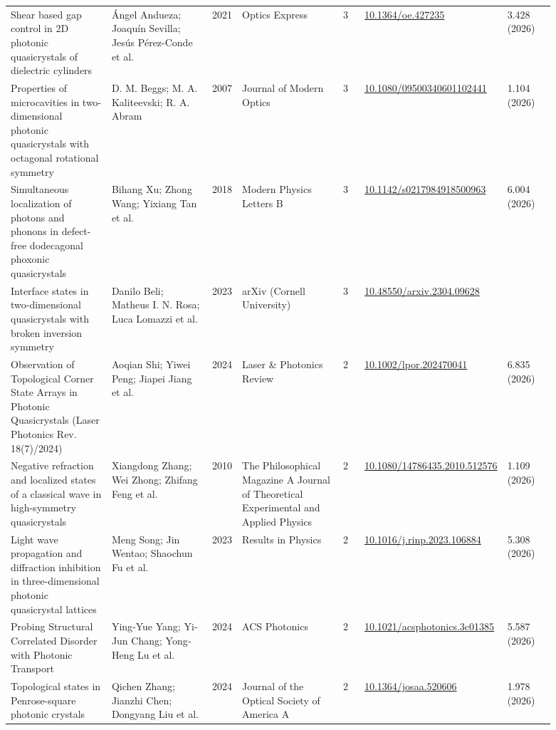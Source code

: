 \documentclass[10pt,a4paper]{article}
\begin{document}
{\begin{longtable}{p{0.192\linewidth}p{0.192\linewidth}p{0.043\linewidth}p{0.192\linewidth}p{0.043\linewidth}p{0.132\linewidth}p{0.096\linewidth}}
Shear based gap control in 2D photonic quasicrystals of dielectric cylinders & Ángel Andueza; Joaquín Sevilla; Jesús Pérez-Conde et al. & 2021 & Optics Express & 3 & \href{https://doi.org/10.1364/oe.427235}{10.1364/oe.427235} & 3.428 (2026) \\
Properties of microcavities in two-dimensional photonic quasicrystals with octagonal rotational symmetry & D. M. Beggs; M. A. Kaliteevski; R. A. Abram & 2007 & Journal of Modern Optics & 3 & \href{https://doi.org/10.1080/09500340601102441}{10.1080/09500340601102441} & 1.104 (2026) \\
Simultaneous localization of photons and phonons in defect-free dodecagonal phoxonic quasicrystals & Bihang Xu; Zhong Wang; Yixiang Tan et al. & 2018 & Modern Physics Letters B & 3 & \href{https://doi.org/10.1142/s0217984918500963}{10.1142/s0217984918500963} & 6.004 (2026) \\
Interface states in two-dimensional quasicrystals with broken inversion symmetry & Danilo Beli; Matheus I. N. Rosa; Luca Lomazzi et al. & 2023 & arXiv (Cornell University) & 3 & \href{https://doi.org/10.48550/arxiv.2304.09628}{10.48550/arxiv.2304.09628} &  \\
Observation of Topological Corner State Arrays in Photonic Quasicrystals (Laser Photonics Rev. 18(7)/2024) & Aoqian Shi; Yiwei Peng; Jiapei Jiang et al. & 2024 & Laser \& Photonics Review & 2 & \href{https://doi.org/10.1002/lpor.202470041}{10.1002/lpor.202470041} & 6.835 (2026) \\
Negative refraction and localized states of a classical wave in high-symmetry quasicrystals & Xiangdong Zhang; Wei Zhong; Zhifang Feng et al. & 2010 & The Philosophical Magazine A Journal of Theoretical Experimental and Applied Physics & 2 & \href{https://doi.org/10.1080/14786435.2010.512576}{10.1080/14786435.2010.512576} & 1.109 (2026) \\
Light wave propagation and diffraction inhibition in three-dimensional photonic quasicrystal lattices & Meng Song; Jin Wentao; Shaochun Fu et al. & 2023 & Results in Physics & 2 & \href{https://doi.org/10.1016/j.rinp.2023.106884}{10.1016/j.rinp.2023.106884} & 5.308 (2026) \\
Probing Structural Correlated Disorder with Photonic Transport & Ying‐Yue Yang; Yi‐Jun Chang; Yong‐Heng Lu et al. & 2024 & ACS Photonics & 2 & \href{https://doi.org/10.1021/acsphotonics.3c01385}{10.1021/acsphotonics.3c01385} & 5.587 (2026) \\
Topological states in Penrose-square photonic crystals & Qichen Zhang; Jianzhi Chen; Dongyang Liu et al. & 2024 & Journal of the Optical Society of America A & 2 & \href{https://doi.org/10.1364/josaa.520606}{10.1364/josaa.520606} & 1.978 (2026) \\

\end{longtable}}
\end{document}
